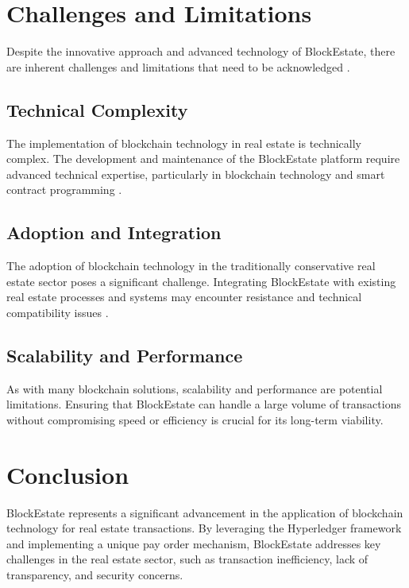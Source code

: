 \documentclass[3p,times]{elsarticle}
\begin{document}
\section{Challenges and Limitations}

Despite the innovative approach and advanced technology of BlockEstate, there are inherent challenges and limitations that need to be acknowledged \cite{tilbury2019business}.

\subsection{Technical Complexity}

The implementation of blockchain technology in real estate is technically complex. The development and maintenance of the BlockEstate platform require advanced technical expertise, particularly in blockchain technology and smart contract programming \cite{jain2020blockchain}. 

\subsection{Adoption and Integration}

The adoption of blockchain technology in the traditionally conservative real estate sector poses a significant challenge. Integrating BlockEstate with existing real estate processes and systems may encounter resistance and technical compatibility issues \cite{yacob2021blockchain}.

\subsection{Scalability and Performance}

As with many blockchain solutions, scalability and performance are potential limitations. Ensuring that BlockEstate can handle a large volume of transactions without compromising speed or efficiency is crucial for its long-term viability.

\section{Conclusion}

BlockEstate represents a significant advancement in the application of blockchain technology for real estate transactions. By leveraging the Hyperledger framework and implementing a unique pay order mechanism, BlockEstate addresses key challenges in the real estate sector, such as transaction inefficiency, lack of transparency, and security concerns.
\end{document}
